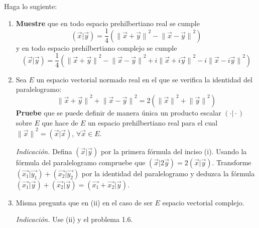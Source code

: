\documentclass[12pt]{report}
\theoremstyle{largebreak}
\newcommand\pint[2]{\ensuremath{\left(#1\big|#2\right)}}
\newcommand\norm[1]{\ensuremath{\|#1\|}}
\begin{document}
    \begin{excer}
        Haga lo sugiente:
        \begin{enumerate}
            \item \textbf{Muestre} que en todo espacio prehilbertiano real se cumple
            \begin{equation*}
                \pint{\vec{x}}{\vec{y}}=\frac{1}{4}\left(\norm{\vec{x}+\vec{y}}^2-\norm{\vec{x}-\vec{y}}^2 \right)
            \end{equation*}
            y en todo espacio prehilbertiano complejo se cumple
            \begin{equation*}
                \pint{\vec{x}}{\vec{y}}=\frac{1}{4}\left(\norm{\vec{x}+\vec{y}}^2-\norm{\vec{x}-\vec{y}}^2+i\norm{\vec{x}+i\vec{y}}^2-i\norm{\vec{x}-i\vec{y}}^2 \right)
            \end{equation*}
            \item Sea $E$ un espacio vectorial normado real en el que se verifica la identidad del paralelogramo:
            \begin{equation*}
                \norm{\vec{x}+\vec{y}}^2+\norm{\vec{x}-\vec{y}}^2=2(\norm{\vec{x}}^2+\norm{\vec{y}}^2)
            \end{equation*}
            \textbf{Pruebe} que se puede definir de manera única un producto escalar $\pint{\cdot}{\cdot}$ sobre $E$ que hace de $E$ un espacio prehilbertiano real para el cual $\norm{\vec{x}}^2=\pint{\vec{x}}{\vec{x}}$, $\forall\vec{x}\in E$.

            \textit{Indicación.} Defina $\pint{\vec{x}}{\vec{y}}$ por la primera fórmula del inciso (i). Usando la fórmula del paralelogramo compruebe que $\pint{\vec{x}}{2\vec{y}}=2\pint{\vec{x}}{\vec{y}}$. Transforme $\pint{\vec{x_1}}{\vec{y_1}}+\pint{\vec{x_2}}{\vec{y_2}}$ por la identidad del paralelogramo y deduzca la fórmula $\pint{\vec{x_1}}{\vec{y}}+\pint{\vec{x_2}}{\vec{y}}=\pint{\vec{x_1}+\vec{x_2}}{\vec{y}}$.

            \item Misma pregunta que en (ii) en el caso de ser $E$ espacio vectorial complejo. 
            
            \textit{Indicación.} Use (ii) y el problema 1.6.
        \end{enumerate}
    \end{excer}
\end{document}
